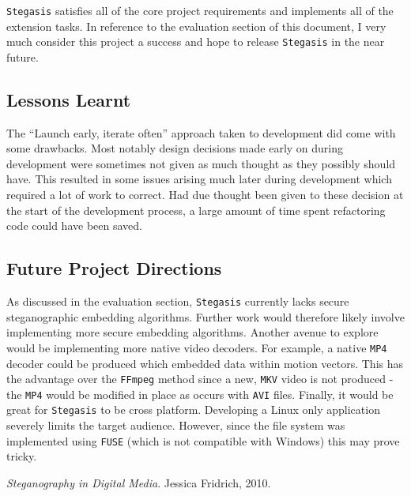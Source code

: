 \documentclass[paper=a4, fontsize=11pt,twoside]{scrartcl}    %
\numberwithin{table}{section}
\numberwithin{figure}{section}
\numberwithin{algorithm}{section}
\begin{document}
\texttt{Stegasis} satisfies all of the core project requirements and implements all of the extension tasks. In reference to the evaluation section of this document, I very much consider this project a success and hope to release \texttt{Stegasis} in the near future.

\subsection{Lessons Learnt}

The ``Launch early, iterate often'' approach taken to development did come with some drawbacks. Most notably design decisions made early on during development were sometimes not given as much thought as they possibly should have. This resulted in some issues arising much later during development which required a lot of work to correct. Had due thought been given to these decision at the start of the development process, a large amount of time spent refactoring code could have been saved. 

\subsection{Future Project Directions}

As discussed in the evaluation section, \texttt{Stegasis} currently lacks secure steganographic embedding algorithms. Further work would therefore likely involve implementing more secure embedding algorithms. Another avenue to explore would be implementing more native video decoders. For example, a native \texttt{MP4} decoder could be produced which embedded data within motion vectors. This has the advantage over the \texttt{FFmpeg} method since a new, \texttt{MKV} video is not produced - the \texttt{MP4} would be modified in place as occurs with \texttt{AVI} files.
Finally, it would be great for \texttt{Stegasis} to be cross platform. Developing a Linux only application severely limits the target audience. However, since the file system was implemented using \texttt{FUSE} (which is not compatible with Windows) this may prove tricky.

\vfill

\pagebreak

\begin{thebibliography}{1}

  \emph{Steganography in Digital Media}.
  Jessica Fridrich, 2010.

\end{thebibliography}
\end{document}
